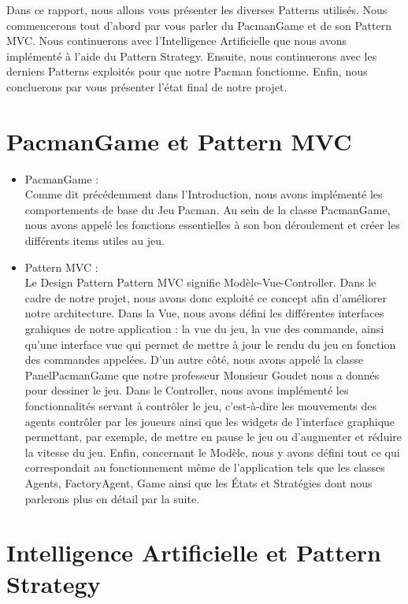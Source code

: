 \documentclass[a4paper, 11pt]{article}
\begin{document}
Dans ce rapport, nous allons vous présenter les diverses Patterns utilisés. Nous commencerons tout d'abord par vous parler du PacmanGame et de son Pattern MVC. Nous continuerons
avec l'Intelligence Artificielle que nous avons implémenté à l'aide du Pattern Strategy. Ensuite, nous continuerons avec les derniers Patterns exploités pour que notre 
Pacman fonctionne. Enfin, nous concluerons par vous présenter l'état final de notre projet.


\part{PacmanGame et Pattern MVC}
\begin{itemize}
  \item PacmanGame :  \\ 
  
Comme dit précédemment dans l'Introduction, nous avons implémenté les comportements de base du Jeu Pacman. Au sein de la classe PacmanGame, nous avons appelé
les fonctions essentielles à son bon déroulement et créer les différents items utiles au jeu. \\
 
  \item Pattern MVC : \\
  
Le Design Pattern Pattern MVC signifie Modèle-Vue-Controller. Dans le cadre de notre projet, nous avons donc exploité ce concept afin d'améliorer
notre architecture. Dans la Vue, nous avons défini les différentes interfaces grahiques de notre application : la vue du jeu, la vue des commande,
ainsi qu'une interface vue qui permet de mettre à jour le rendu du jeu en fonction des commandes appelées. D'un autre côté, nous avons appelé la
classe PanelPacmanGame que notre professeur Monsieur Goudet nous a donnés pour dessiner le jeu. Dans le Controller, nous avons implémenté les 
fonctionnalités servant à contrôler le jeu, c'est-à-dire les mouvements des agents contrôler par les joueurs ainsi que les widgets de l'interface
graphique permettant, par exemple, de mettre en pause le jeu ou d'augmenter et réduire la vitesse du jeu. Enfin, concernant le Modèle, nous y avons
défini tout ce qui correspondait au fonctionnement même de l'application tels que les classes Agents, FactoryAgent, Game ainsi que les États et Stratégies 
dont nous parlerons plus en détail par la suite. 

\end{itemize}

\part{Intelligence Artificielle et Pattern Strategy}
\end{document}
